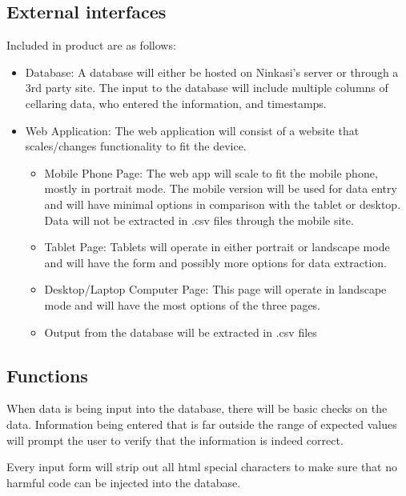 \documentclass[draftclsnofoot,onecolumn,letterpaper,10pt,compsoc]{IEEEtran}
\begin{document}
	\subsection{External interfaces}
    Included in product are as follows:
        \begin{itemize}
						\item{Database: A database will either be hosted on Ninkasi's server or through a 3rd party site.
						The input to the database will include multiple columns of cellaring data, who entered the information, and timestamps. }

            \item{Web Application:}
            The web application will consist of a website that scales/changes functionality to fit the device.

                \begin{itemize}
										\item{Mobile Phone Page: The web app will scale to fit the mobile phone, mostly in portrait mode.
										The mobile version will be used for data entry and will have minimal options in comparison with the tablet or desktop.
										Data will not be extracted in .csv files through the mobile site.}

                    \item{Tablet Page: Tablets will operate in either portrait or landscape mode and will have the form and possibly more options for data extraction.}

                    \item{Desktop/Laptop Computer Page: This page will operate in landscape mode and will have the most options of the three pages.}

                    \item{Output from the database will be extracted in .csv files}
                \end{itemize}
        \end{itemize}

	\subsection{Functions}

		When data is being input into the database, there will be basic checks on the data.
		Information being entered that is far outside the range of expected values will prompt the user to verify that the information is indeed correct.

		Every input form will strip out all html special characters to make sure that no harmful code can be injected into the database.
\end{document}

